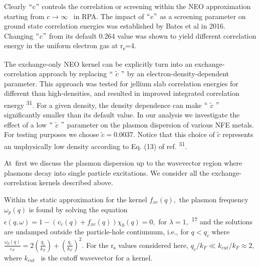 \documentclass[12pt]{article}
\renewcommand{\_}{\kern-1.5pt\textunderscore\kern-1.5pt}
\begin{document}
\begin{justify}
Clearly $``$c$"$  controls the correlation or screening within the NEO approximation starting from  \( c \rightarrow \infty \) \ in RPA. The impact of $``$c$"$  as a screening parameter on ground state correlation energies was established by Bates et al in 2016.  Changing $``$c$"$  from its default 0.264 value was shown to yield different correlation energy in the uniform electron gas at r\textsubscript{s}=4. 
\end{justify}\par

\begin{justify}
The exchange-only NEO kernel can be explicitly turn into an exchange-correlation approach by replacing $``$ \( \widetilde{c} \) $"$  by an electron-density-dependent parameter. This approach was tested for jellium slab correlation energies for different than high-densities, and resulted in improved integrated correlation energy \textsuperscript{31}. For a given density, the density dependence can make $``$ \( \widetilde{c} \) $"$  significantly smaller than its default value. In our analysis we investigate the effect of a low $``$ \( \widetilde{c} \) $"$  parameter on the plasmon dispersion of various NFE metals. For testing purposes we choose  \( \widetilde{c}=0.0037. \)  Notice that this choice of  \( \widetilde{c} \)  represents an unphysically low density according to Eq. (13) of ref. \textsuperscript{31}. 
\end{justify}\par

\begin{justify}
At\ first we discuss the plasmon dispersion up to the wavevector region where plasmons decay into single particle excitations. We consider all the exchange-correlation kernels described above.  
\end{justify}\par

\begin{justify}
Within the static approximation for the kernel  \( f_{xc} \left( q \right) , \)  the plasmon frequency  \(  \omega _{p} \left( q \right)  \)  is found by solving the equation  \(  \epsilon  \left( q, \omega  \right) =1- \left( v_{c} \left( q \right) +f_{xc} \left( q \right)  \right)  \chi _{0} \left( q \right) =0, \)  for  \(  \lambda =1,  \) \textsuperscript{17} and the solutions are undamped outside the particle-hole contiunuum, i.e., for  \( q<q_{c} \)  where  \( \frac{ \omega _{p} \left( q \right) }{ \varepsilon _{F}}=2 \left( \frac{q_{c}}{k_{F}} \right) + \left( \frac{q_{c}}{k_{F}} \right) ^{2}. \)  For the r\textsubscript{s }values considered here,  \( q_{c}/k_{F} \ll k_{cut}/k_{F} \approx 2, \)  where  \( k_{cut} \) \  is the cutoff wavevector for a kernel.
\end{justify}\par
\end{document}
